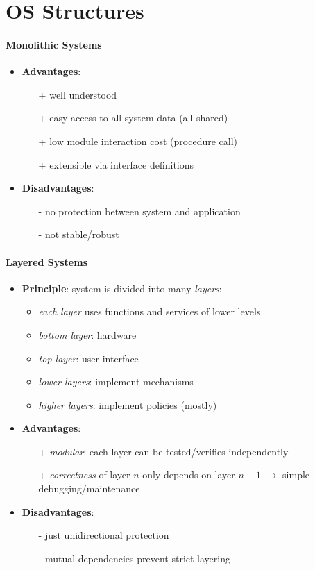 \section{OS Structures}

\paragraph{Monolithic Systems}
\begin{itemize}
  \item \textbf{Advantages}:
  \begin{itemize}
    \item[+] well understood 
    \item[+] easy access to all system data (all shared) 
    \item[+] low module interaction cost (procedure call) 
    \item[+] extensible via interface definitions
   \end{itemize} 
  \item \textbf{Disadvantages}:
  \begin{itemize}
    \item[-] no protection between system and application 
    \item[-] not stable/robust
  \end{itemize}
\end{itemize}

\paragraph{Layered Systems}
\begin{itemize}
  \item \textbf{Principle}: system is divided into many \emph{layers}:
  \begin{itemize}
    \item \emph{each layer} uses functions and services of lower levels 
    \item \emph{bottom layer}: hardware 
    \item \emph{top layer}: user interface 
    \item \emph{lower layers}: implement mechanisms 
    \item \emph{higher layers}: implement policies (mostly)
  \end{itemize}
  \item \textbf{Advantages}: 
  \begin{itemize}
    \item[+] \emph{modular}: each layer can be tested/verifies independently 
    \item[+] \emph{correctness} of layer $ n $ only depends on layer $ n-1 $ $ \to $ simple debugging/maintenance
  \end{itemize}
  \item \textbf{Disadvantages}:
  \begin{itemize}
    \item[-] just unidirectional protection 
    \item[-] mutual dependencies prevent strict layering
  \end{itemize}
\end{itemize}

